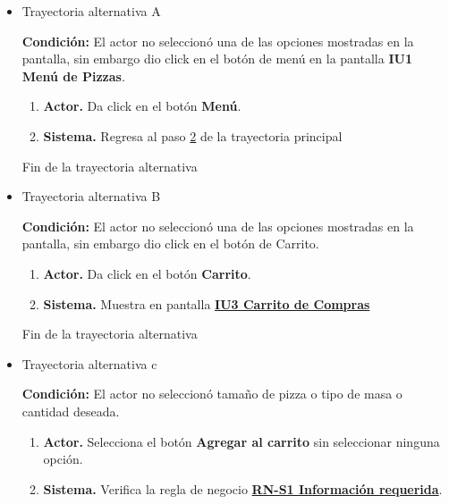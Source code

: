 	\begin{itemize}

		\item \hypertarget{CU1:TAA}{Trayectoria alternativa A}

			\noindent \textbf{Condición:} El actor no seleccionó una de las opciones mostradas en la pantalla, sin embargo dio click en el botón de menú en la pantalla \textbf{IU1 Menú de Pizzas}.
			
			\begin{enumerate}
				\item \textbf{Actor.} Da click en el botón \textbf{Menú}.
				\item \textbf{Sistema.} Regresa al paso \hyperlink{CU1:TP:P2}{2} de la trayectoria principal
			\end{enumerate}
			
			Fin de la trayectoria alternativa
			
			\item \hypertarget{CU1:TAB}{Trayectoria alternativa B}
			
			\noindent \textbf{Condición:} El actor no seleccionó una de las opciones mostradas en la pantalla, sin embargo dio click en el botón de Carrito.
			
			\begin{enumerate}
				\item \textbf{Actor.} Da click en el botón \textbf{Carrito}.
				\item \textbf{Sistema.} Muestra en pantalla \hyperlink{IU3}{\textbf{IU3 Carrito de Compras}}
			\end{enumerate}
			
			Fin de la trayectoria alternativa
			
		\item \hypertarget{CU1:TAC}{Trayectoria alternativa c}
			
			\noindent \textbf{Condición:} El actor no seleccionó tamaño de pizza o tipo de masa o cantidad deseada.
			
			\begin{enumerate}
				\item \textbf{Actor.} Selecciona el botón \textbf{Agregar al carrito} sin seleccionar ninguna opción. 
				
				\item \textbf{Sistema.} Verifica la regla de negocio \hyperlink{RN:S1:InfoRequerida}{\textbf{RN-S1 Información requerida}}.
				

\end{enumerate}
\end{itemize}
